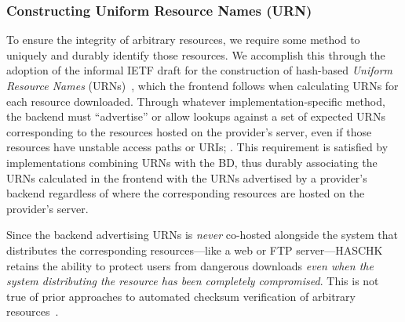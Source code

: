 \subsubsection{Constructing Uniform Resource Names (URN)}

To ensure the integrity of arbitrary resources, we require some method to
uniquely and durably identify those resources. We accomplish this through the
adoption of the informal IETF draft for the construction of hash-based
\emph{Uniform Resource Names} (URNs)~\cite{draft-URN}, which the frontend
follows when calculating URNs for each resource downloaded. Through whatever
implementation-specific method, the backend must ``advertise'' or allow lookups
against a set of expected URNs corresponding to the resources hosted on the
provider's server, even if those resources have unstable access paths or URIs;
. This requirement is satisfied by implementations combining URNs with
the BD, thus durably associating the URNs calculated in the frontend with the
URNs advertised by a provider's backend regardless of where the corresponding
resources are hosted on the provider's server.

Since the backend advertising URNs is \emph{never} co-hosted alongside the
system that distributes the corresponding resources---like a web or FTP
server---HASCHK retains the ability to protect users from dangerous downloads
\emph{even when the system distributing the resource has been completely
compromised}. This is not true of prior approaches to automated checksum
verification of arbitrary resources~\cite{Cherubini}.
